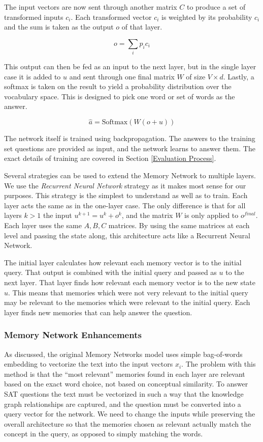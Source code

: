 \documentclass[pageno]{final_paper}
\begin{document}
The input vectors are now sent through another matrix $C$ to produce a set of
transformed inputs ${c_i}$. Each transformed vector $c_i$ is weighted by its
probability $c_i$ and the sum is taken as the output $o$ of that layer.

$$o = \sum_i p_i c_i$$

This output can then be fed as an input to the next layer, but in the single
layer case it is added to $u$ and sent through one final matrix $W$ of size
$V\times d$. Lastly, a softmax is taken on the result to yield a probability
distribution over the vocabulary space. This is designed to pick one word
or set of words as the answer.

$$\hat{a} = \text{Softmax}\left(W\left(o + u\right)\right)$$

The network itself is trained using backpropagation. The answers to the training
set questions are provided as input, and the network learns to answer them. The
exact details of training are covered in Section \ref{Evaluation Process}.

Several strategies can be used to extend the Memory Network to multiple layers.
We use the \textit{Recurrent Neural Network} strategy as it makes most sense for
our purposes. This strategy is the simplest to understand as well as to train.
Each layer acts the same as in the one-layer case. The only difference is that
for all layers $k > 1$ the input $u^{k+1} = u^k + o^k$, and the matrix $W$ is
only applied to $o^{final}$. Each layer uses the same $A,B,C$ matrices. By using
the same matrices at each level and passing the state along, this architecture
acts like a Recurrent Neural Network.

The initial layer calculates how relevant each memory vector is to the initial
query. That output is combined with the initial query and passed as $u$ to the
next layer. That layer finds how relevant each memory vector is to the new state
$u$. This means that memories which were not very relevant to the initial query
may be relevant to the memories which were relevant to the initial query. Each
layer finds new memories that can help answer the question.

\subsubsection{Memory Network Enhancements}
\label{Memory Network Enhancements}

As discussed, the original Memory Networks model uses simple bag-of-words
embedding to vectorize the text into the input vectors ${x_i}$. The problem with
this method is that the ``most relevant'' memories found in each layer are
relevant based on the exact word choice, not based on conceptual similarity. To
answer SAT questions the text must be vectorized in such a way that the
knowledge graph relationships are captured, and the question must be converted
into a query vector for the network. We need to change the inputs while
preserving the overall architecture so that the memories chosen as relevant
actually match the concept in the query, as opposed to simply matching the
words.
\end{document}
